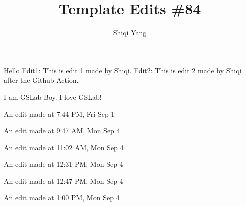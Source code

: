 \documentclass{report}
\title{\Huge{Template Edits \#84}\\}
\author{\huge{Shiqi Yang}}
\date{}
\begin{document}
\maketitle
Hello
Edit1: This is edit 1 made by Shiqi.
Edit2: This is edit 2 made by Shiqi after the Github Action.


I am GSLab Boy. I love GSLab!

An edit made at 7:44 PM, Fri Sep 1

An edit made at 9:47 AM, Mon Sep 4

An edit made at 11:02 AM, Mon Sep 4

An edit made at 12:31 PM, Mon Sep 4

An edit made at 12:47 PM, Mon Sep 4

An edit made at 1:00 PM, Mon Sep 4
\end{document}
